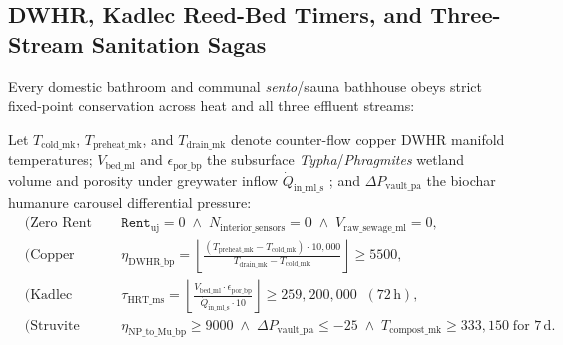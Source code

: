 \subsection{DWHR, Kadlec Reed-Bed Timers, and Three-Stream Sanitation Sagas}

Every domestic bathroom and communal \textit{sento}/sauna bathhouse obeys strict fixed-point
conservation across heat and all three effluent streams:

\begin{invariant}
\label{inv:zeta-sanitation}
Let $T_{\mathrm{cold\_mk}}$, $T_{\mathrm{preheat\_mk}}$, and $T_{\mathrm{drain\_mk}}$ denote
counter-flow copper DWHR manifold temperatures; $V_{\mathrm{bed\_ml}}$ and $\epsilon_{\mathrm{por\_bp}}$
the subsurface \textit{Typha}/\textit{Phragmites} wetland volume and porosity under greywater inflow
$\dot{Q}_{\mathrm{in\_ml\_s}}$ \parencite{kadlec1996}; and $\Delta P_{\mathrm{vault\_pa}}$
the biochar humanure carousel differential pressure:
\begin{align}
    &\text{(Zero Rent \& Privacy)} && \mathtt{Rent}_{\mathrm{uj}} = 0 \;\land\; N_{\mathrm{interior\_sensors}} = 0 \;\land\; V_{\mathrm{raw\_sewage\_ml}} = 0, \label{eq:zeta-rent}\\
    &\text{(Copper DWHR Gate)} && \eta_{\mathrm{DWHR\_bp}} = \left\lfloor \frac{(T_{\mathrm{preheat\_mk}} - T_{\mathrm{cold\_mk}}) \cdot 10{,}000}{T_{\mathrm{drain\_mk}} - T_{\mathrm{cold\_mk}}} \right\rfloor \ge 5500, \label{eq:zeta-dwhr}\\
    &\text{(Kadlec Wetland HRT)} && \tau_{\mathrm{HRT\_ms}} = \left\lfloor \frac{V_{\mathrm{bed\_ml}} \cdot \epsilon_{\mathrm{por\_bp}}}{\dot{Q}_{\mathrm{in\_ml\_s}} \cdot 10} \right\rfloor \ge 259{,}200{,}000\;\;(72\,\mathrm{h}), \label{eq:zeta-kadlec}\\
    &\text{(Struvite \& Pathogen)} && \eta_{\mathrm{NP\_to\_Mu\_bp}} \ge 9000 \;\land\; \Delta P_{\mathrm{vault\_pa}} \le -25 \;\land\; T_{\mathrm{compost\_mk}} \ge 333{,}150\;\text{for } 7\,\mathrm{d}. \label{eq:zeta-mu}
\end{align}
\end{invariant}

